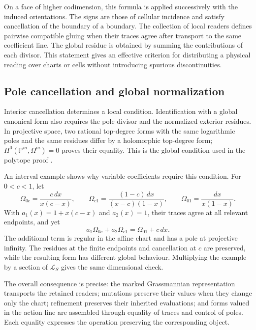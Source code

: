On a face of higher codimension, this formula is applied successively
with the induced orientations. The signs are those of cellular
incidence and satisfy cancellation of the boundary of a boundary. The collection of
local readers defines pairwise compatible gluing when their
traces agree after transport to the same coefficient line.
The global residue is obtained by summing the contributions of each divisor.
This statement gives an effective criterion for distributing a physical
reading over charts or cells without introducing spurious discontinuities.

\subsection{Pole cancellation and global normalization}

Interior cancellation determines a local condition. Identification
with a global canonical form also requires the pole divisor and
the normalized exterior residues. In projective space, two
rational top-degree forms with the same logarithmic poles
and the same residues differ by a holomorphic top-degree form;
\(H^0(\mathbb P^m,\Omega^m)=0\) proves their equality.
This is the global condition used in the polytope proof
\cite{positive}.

An interval example shows why variable coefficients
require this condition. For \(0<c<1\), let
\[
 \Omega_{0c}=\frac{c\,dx}{x(c-x)},\qquad
 \Omega_{c1}=\frac{(1-c)\,dx}{(x-c)(1-x)},\qquad
 \Omega_{01}=\frac{dx}{x(1-x)}.
\]
With \(a_1(x)=1+x(c-x)\) and \(a_2(x)=1\), their traces agree
at all relevant endpoints, and yet
\[
 a_1\Omega_{0c}+a_2\Omega_{c1}=\Omega_{01}+c\,dx.
\]
The additional term is regular in the affine chart and has a pole at
projective infinity. The residues at the finite endpoints and
cancellation at \(c\) are preserved, while the resulting form
has different global behaviour. Multiplying the example by a
section of \(\mathcal L_S\) gives the same dimensional check.

The overall consequence is precise: the marked Grassmannian
representation transports the retained readers; mutations preserve their
values when they change only the chart; refinement preserves their
inherited evaluations; and forms valued in the action line
are assembled through equality of traces and control of poles. Each
equality expresses the operation preserving the corresponding object.
